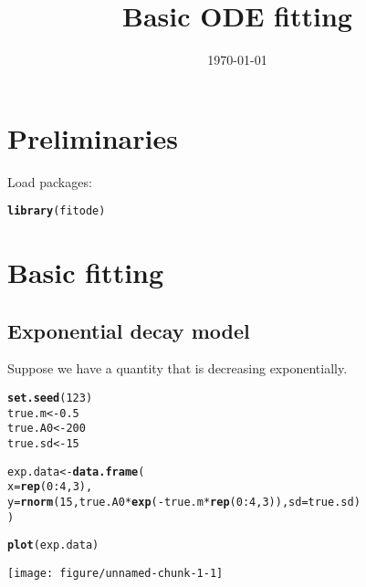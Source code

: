 \documentclass{article}\usepackage[]{graphicx}\usepackage[]{color}
\title{Basic ODE fitting}
\date{\today}
\makeatletter
\def\maxwidth{ %
  \ifdim\Gin@nat@width>\linewidth
    \linewidth
  \else
    \Gin@nat@width
  \fi
}
\newcommand{\hlnum}[1]{\textcolor[rgb]{0.686,0.059,0.569}{#1}}%
\newcommand{\hlopt}[1]{\textcolor[rgb]{0,0,0}{#1}}%
\newcommand{\hlstd}[1]{\textcolor[rgb]{0.345,0.345,0.345}{#1}}%
\newcommand{\hlkwb}[1]{\textcolor[rgb]{0.69,0.353,0.396}{#1}}%
\newcommand{\hlkwc}[1]{\textcolor[rgb]{0.333,0.667,0.333}{#1}}%
\newcommand{\hlkwd}[1]{\textcolor[rgb]{0.737,0.353,0.396}{\textbf{#1}}}%
\newenvironment{kframe}{%
 \def\at@end@of@kframe{}%
 \ifinner\ifhmode%
  \def\at@end@of@kframe{\end{minipage}}%
  \begin{minipage}{\columnwidth}%
 \fi\fi%
 \def\FrameCommand##1{\hskip\@totalleftmargin \hskip-\fboxsep
 \colorbox{shadecolor}{##1}\hskip-\fboxsep
     \hskip-\linewidth \hskip-\@totalleftmargin \hskip\columnwidth}%
 \MakeFramed {\advance\hsize-\width
   \@totalleftmargin\z@ \linewidth\hsize
   \@setminipage}}%
 {\par\unskip\endMakeFramed%
 \at@end@of@kframe}
\newenvironment{knitrout}{}{} %
\makeatother
\begin{document}
\maketitle



\tableofcontents

\section{Preliminaries}

Load packages:

\begin{knitrout}
\color{fgcolor}\begin{kframe}
\begin{alltt}
\hlkwd{library}\hlstd{(fitode)}
\end{alltt}
\end{kframe}
\end{knitrout}

\section{Basic fitting}

\subsection{Exponential decay model}

Suppose we have a quantity that is decreasing exponentially.

\begin{knitrout}
\color{fgcolor}\begin{kframe}
\begin{alltt}
\hlkwd{set.seed}\hlstd{(}\hlnum{123}\hlstd{)}
\hlstd{true.m} \hlkwb{<-} \hlnum{0.5}
\hlstd{true.A0} \hlkwb{<-} \hlnum{200}
\hlstd{true.sd} \hlkwb{<-} \hlnum{15}

\hlstd{exp.data} \hlkwb{<-} \hlkwd{data.frame}\hlstd{(}
    \hlkwc{x}\hlstd{=}\hlkwd{rep}\hlstd{(}\hlnum{0}\hlopt{:}\hlnum{4}\hlstd{,} \hlnum{3}\hlstd{),}
    \hlkwc{y}\hlstd{=}\hlkwd{rnorm}\hlstd{(}\hlnum{15}\hlstd{, true.A0} \hlopt{*} \hlkwd{exp}\hlstd{(}\hlopt{-}\hlstd{true.m} \hlopt{*} \hlkwd{rep}\hlstd{(}\hlnum{0}\hlopt{:}\hlnum{4}\hlstd{,} \hlnum{3}\hlstd{)),} \hlkwc{sd}\hlstd{=true.sd)}
\hlstd{)}

\hlkwd{plot}\hlstd{(exp.data)}
\end{alltt}
\end{kframe}
\texttt{[image: figure/unnamed-chunk-1-1]} 

\end{knitrout}
\end{document}
